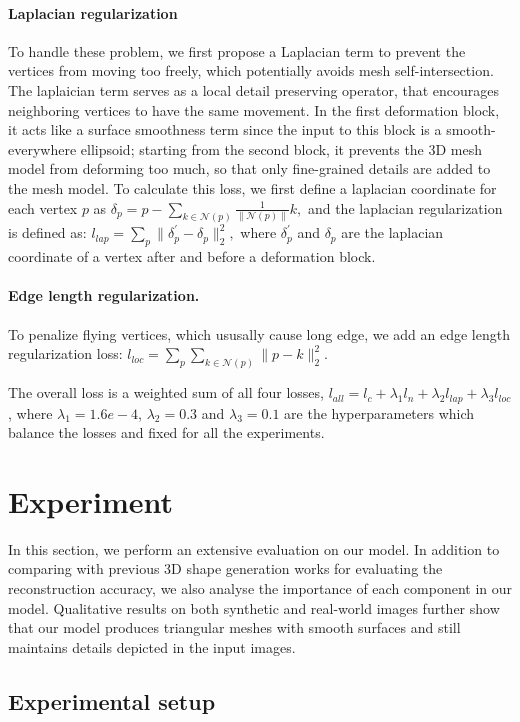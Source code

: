 \documentclass[runningheads]{llncs}
\def\calN{\mathcal{N}}
\begin{document}
\paragraph{Laplacian regularization} To handle these problem, we first propose a Laplacian term to prevent the vertices from moving too freely, which potentially avoids mesh self-intersection. The laplaician term serves as a local detail preserving operator, that encourages neighboring vertices to have the same movement. 
In the first deformation block, it acts like a surface smoothness term since the input to this block is a smooth-everywhere ellipsoid; starting from the second block, it prevents the 3D mesh model from deforming too much, so that only fine-grained details are added to the mesh model.
To calculate this loss, we first define a laplacian coordinate for each vertex $p$ as
$\delta_p=p-\sum_{k\in \calN(p)} \frac{1}{\|\calN(p)\|}k,$
and the laplacian regularization is defined as:
$l_{lap}=\sum_{p}\|\delta^\prime_p-\delta_p\|_2^2,$
where $\delta^\prime_p$ and $\delta_p$ are the laplacian coordinate of a vertex after and before a deformation block.

\paragraph{Edge length regularization.} To penalize flying vertices, which ususally cause long edge, we add an edge length regularization loss:
$l_{loc}=\sum_{p}\sum_{k\in \calN(p)}\|p-k\|_2^2.$


The overall loss is a weighted sum of all four losses, $l_{all} = l_c+\lambda_1l_n+\lambda_2l_{lap}+\lambda_3l_{loc}$, where $\lambda_1=1.6e-4$, $\lambda_2=0.3$ and $\lambda_3=0.1$ are the hyperparameters which balance the losses and fixed for all the experiments. 
\section{Experiment}
\label{sec:exp}

In this section, we perform an extensive evaluation on our model. In addition to comparing with previous 3D shape generation works for evaluating the reconstruction accuracy, we also analyse the importance of each component in our model. Qualitative results on both synthetic and real-world images further show that our model produces triangular meshes with smooth surfaces and still maintains details depicted in the input images.

\subsection{Experimental setup}
\end{document}
